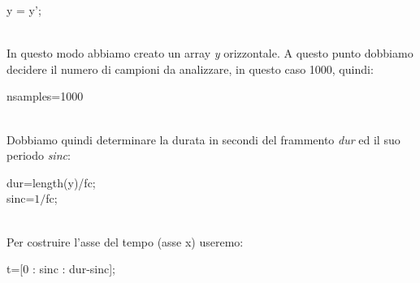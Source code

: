 \documentclass[11pt]{article}
\begin{document}
\begin{multicols*}{2}
\begin{center}
\begin{minipage}[c]{6.2cm}
\begin{sffamily}
\scriptsize

y = y'; \\

\end{sffamily}
\end{minipage}
\end{center}\\

In questo modo abbiamo creato un array \textit{y} orizzontale.
A questo punto dobbiamo decidere il numero di campioni da analizzare, in questo caso 1000, quindi:
 
 \begin{center}
\begin{minipage}[c]{6.2cm}
\begin{sffamily}
\scriptsize

nsamples=1000\\

\end{sffamily}
\end{minipage}
\end{center}\\

Dobbiamo quindi determinare la durata in secondi del frammento \textit{dur} ed il suo periodo \textit{sinc}:

 \begin{center}
\begin{minipage}[c]{6.2cm}
\begin{sffamily}
\scriptsize

dur=length(y)/fc;\\
sinc=$1/$fc;\\

\end{sffamily}
\end{minipage}
\end{center}\\

Per costruire l'asse del tempo (asse x) useremo:

 \begin{center}
\begin{minipage}[c]{6.2cm}
\begin{sffamily}
\scriptsize

t=[0 : sinc : dur-sinc];\\

\end{sffamily}
\end{minipage}
\end{center}\\


\end{multicols*}
\end{document}
